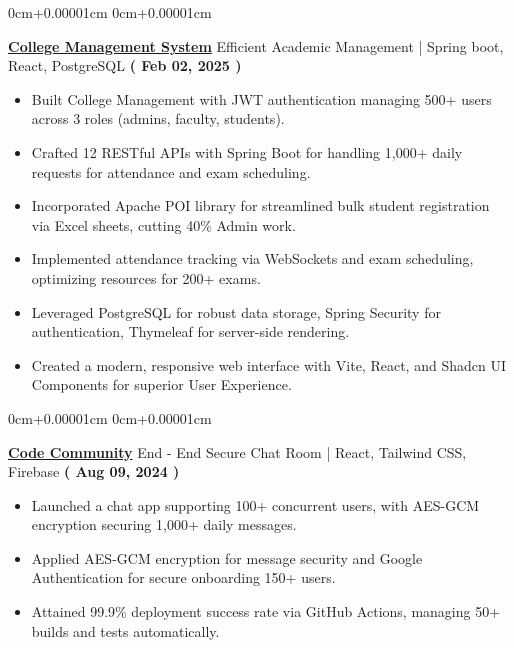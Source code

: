 \documentclass[10pt,a4paper]{article}
\newenvironment{highlights}{
    \begin{itemize}[
        topsep=0.10cm,
        parsep=0.10cm,
        partopsep=0pt,
        itemsep=0pt,
        leftmargin=0cm+10pt
    ]
    }{
    \end{itemize}
}
\newenvironment{onecolentry}{
    \begin{adjustwidth}{
        0cm+0.00001cm
    }{
        0cm+0.00001cm
    }
    }{
    \end{adjustwidth}
}
\begin{document}
    \begin{onecolentry}
        \textbf{\href{https://github.com/Jefino9488/College-Management-Server}{College Management System}} Efficient Academic Management | Spring boot, React, PostgreSQL \hfill \textbf{( Feb 02, 2025 )} \\
        \begin{highlights}
            \item Built College Management with JWT authentication  managing 500+ users across 3 roles (admins, faculty, students). \\
            \item Crafted 12 RESTful APIs with Spring Boot for handling 1,000+ daily requests for attendance and exam scheduling. \\
            \item Incorporated Apache POI library for streamlined bulk student registration via Excel sheets, cutting 40\% Admin work. \\
            \item Implemented attendance tracking via WebSockets and exam scheduling, optimizing resources for 200+ exams. \\
            \item Leveraged PostgreSQL for robust data storage, Spring Security for authentication, Thymeleaf for server-side rendering. \\
            \item Created a modern, responsive web interface with Vite, React, and Shadcn UI Components for superior User Experience. \\
        \end{highlights}
    \end{onecolentry}
    \vspace{0.01cm}
    \begin{onecolentry}
        \textbf{\href{https://github.com/Jefino9488/Code_Community}{Code Community}} End - End Secure Chat Room | React, Tailwind CSS, Firebase \hfill \textbf{( Aug 09, 2024 )} \\
        \begin{highlights}
            \item Launched a chat app supporting 100+ concurrent users, with AES-GCM encryption securing 1,000+ daily messages. \\
            \item Applied AES-GCM encryption for message security and Google Authentication for secure onboarding 150+ users. \\
            \item Attained 99.9\% deployment success rate via GitHub Actions, managing 50+ builds and tests automatically.
        \end{highlights}
    \end{onecolentry}
\end{document}
